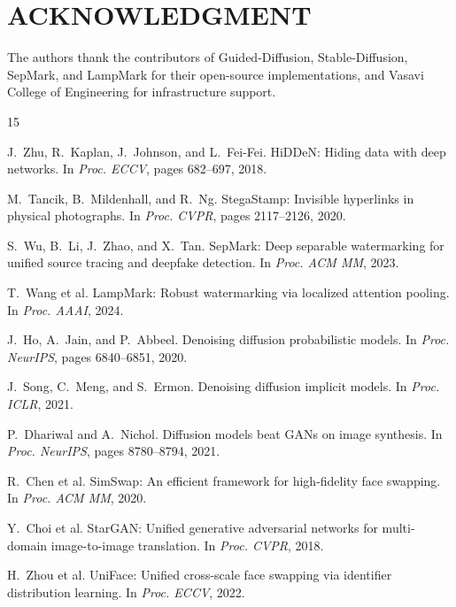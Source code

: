 \documentclass{article}
\begin{document}
\section*{ACKNOWLEDGMENT}
The authors thank the contributors of Guided-Diffusion, Stable-Diffusion, SepMark, and LampMark for their open-source implementations, and Vasavi College of Engineering for infrastructure support.


\begin{thebibliography}{15}

J.~Zhu, R.~Kaplan, J.~Johnson, and L.~Fei-Fei.
\newblock HiDDeN: Hiding data with deep networks.
\newblock In \textit{Proc. ECCV}, pages 682–697, 2018.

M.~Tancik, B.~Mildenhall, and R.~Ng.
\newblock StegaStamp: Invisible hyperlinks in physical photographs.
\newblock In \textit{Proc. CVPR}, pages 2117–2126, 2020.

S.~Wu, B.~Li, J.~Zhao, and X.~Tan.
\newblock SepMark: Deep separable watermarking for unified source tracing and deepfake detection.
\newblock In \textit{Proc. ACM MM}, 2023.

T.~Wang et al.
\newblock LampMark: Robust watermarking via localized attention pooling.
\newblock In \textit{Proc. AAAI}, 2024.

J.~Ho, A.~Jain, and P.~Abbeel.
\newblock Denoising diffusion probabilistic models.
\newblock In \textit{Proc. NeurIPS}, pages 6840–6851, 2020.

J.~Song, C.~Meng, and S.~Ermon.
\newblock Denoising diffusion implicit models.
\newblock In \textit{Proc. ICLR}, 2021.

P.~Dhariwal and A.~Nichol.
\newblock Diffusion models beat GANs on image synthesis.
\newblock In \textit{Proc. NeurIPS}, pages 8780–8794, 2021.

R.~Chen et al.
\newblock SimSwap: An efficient framework for high-fidelity face swapping.
\newblock In \textit{Proc. ACM MM}, 2020.

Y.~Choi et al.
\newblock StarGAN: Unified generative adversarial networks for multi-domain image-to-image translation.
\newblock In \textit{Proc. CVPR}, 2018.

H.~Zhou et al.
\newblock UniFace: Unified cross-scale face swapping via identifier distribution learning.
\newblock In \textit{Proc. ECCV}, 2022.


\end{thebibliography}
\end{document}
